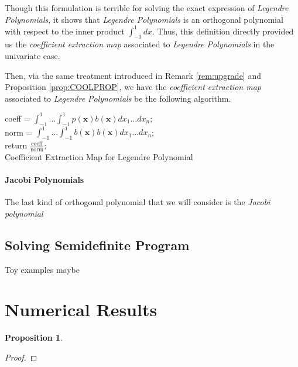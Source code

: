 \documentclass[12pt]{amsart}
\numberwithin{equation}{section}
\newtheorem{prop}[thm]{Proposition}
\theoremstyle{definition}
\numberwithin{thm}{section}
\begin{document}
Though this formulation is terrible for solving the exact expression of \emph{Legendre Polynomials},
it shows that \emph{Legendre Polynomials} is an orthogonal polynomial with respect to the inner product $\int_{-1}^{1} dx$. 
Thus, this definition directly provided us the \emph{coefficient extraction map} associated to \emph{Legendre Polynomials} in the univariate case. 

Then, via the same treatment introduced in Remark \ref{rem:upgrade} and Proposition \ref{prop:COOLPROP},
we have the \emph{coefficient extraction map} associated to \emph{Legendre Polynomials} be the following algorithm.

\begin{algorithm}[H]
     \SetAlgoLined
     coeff = $\int_{-1}^1 ... \int_{-1}^1  p(\mathbf{x})b(\mathbf{x}) dx_1 ... dx_n$;\\
     norm = $\int_{-1}^1 ... \int_{-1}^1 b(\mathbf{x}) b(\mathbf{x}) dx_1 ... dx_n$;\\
     return $\frac{\text{coeff}}{\text{norm}}$;\\
     \caption{Coefficient Extraction Map for Legendre Polynomial}
\end{algorithm}

\paragraph{Jacobi Polynomials}
The last kind of orthogonal polynomial that we will consider is the \emph{Jacobi polynomial}


\subsection{Solving Semidefinite Program}
\label{Sec:Solving Semidefinite Program}




Toy examples maybe

\newpage
\section{Numerical Results}


\begin{prop}

\end{prop}

\begin{proof}

\end{proof}
\end{document}
